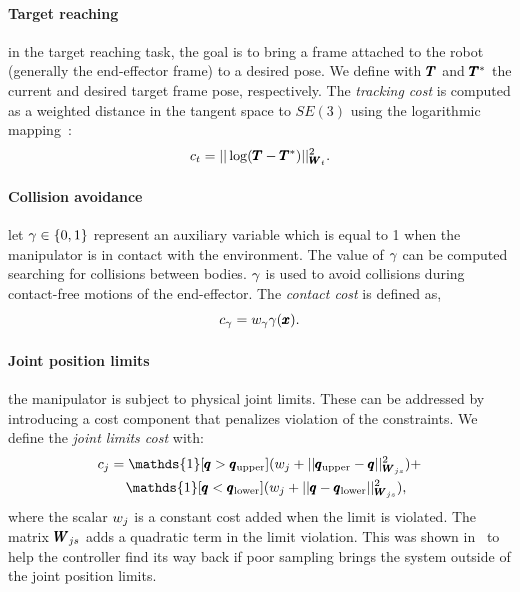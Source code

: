 \paragraph{Target reaching} in the target reaching task, the goal is to bring a frame attached to the robot (generally the end-effector frame) to a desired pose. We define with $\pmb{T}$ and $\pmb{T}^*$ the current and desired target frame pose, respectively. The \textit{tracking cost} is computed as a weighted distance in the tangent space to $SE(3)$ using the logarithmic mapping~\cite{blanco2010tutorial}:
\begin{equation} \label{eq:tracking_cost}
     c_{t} = || \log(\pmb{T} - \pmb{T}^{*}) ||^2_{\pmb{W}_{t}}.
 \end{equation}
 
 \paragraph{Collision avoidance} let $\gamma \in \{0, 1\}$ represent an auxiliary variable which is equal to 1 when the manipulator is in contact with the environment. The value of $\gamma$ can be computed searching for collisions between bodies. 
 $\gamma$ is used to avoid collisions during contact-free motions of the end-effector. 
 The \textit{contact cost} is defined as,
 \begin{equation}
     c_{\gamma}= w_{\gamma} \gamma(\pmb{x}).
 \end{equation}

 \paragraph{Joint position limits} the manipulator is subject to physical joint limits. These can be addressed by introducing a cost component that penalizes violation of the constraints. We define the \textit{joint limits cost} with:
 \begin{align}
     &c_{j} = \mathds{1}[\configRobot > \upperLimits](\weightScalar{j} + ||\upperLimits - \configRobot||^2_{\weightMatrix{js}}) + \nonumber\\ 
     &\qquad\mathds{1}[\configRobot < \lowerLimits](\weightScalar{j} +  || \configRobot - \lowerLimits||^2_{\weightMatrix{js}}), 
 \end{align}
 where the scalar $w_{j}$ is a constant cost added when the limit is violated. The matrix $\pmb{W}_{js}$ adds a quadratic term in the limit violation. This was shown in~\cite{williams_information-theoretic_2018} to help the controller find its way back if poor sampling brings the system outside of the joint position limits.
 
